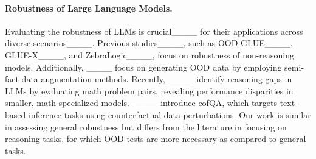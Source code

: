 \paragraph{Robustness of Large Language Models.}



Evaluating the robustness of LLMs is crucial____ for their applications across diverse scenarios____. Previous studies____, such as OOD-GLUE____, GLUE-X____, and ZebraLogic____, focus on robustness of non-reasoning models. 
Additionally, ____ focus on generating OOD data by employing semi-fact data augmentation methods. Recently, ____ identify reasoning gaps in LLMs by evaluating math problem pairs, revealing performance disparities in smaller, math-specialized models. ____ introduce cofQA, which targets text-based inference tasks using counterfactual data perturbations. 
Our work is similar in assessing general robustness but differs from the literature in focusing on reasoning tasks, for which OOD tests are more necessary as compared to general tasks.

